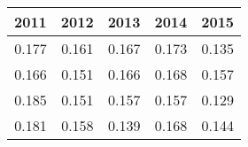 \begin{tabular}{rrrrr}
\toprule
2011 & 2012 & 2013 & 2014 & 2015 \\
\midrule
0.177 & 0.161 & 0.167 & 0.173 & 0.135 \\
0.166 & 0.151 & 0.166 & 0.168 & 0.157 \\
0.185 & 0.151 & 0.157 & 0.157 & 0.129 \\
0.181 & 0.158 & 0.139 & 0.168 & 0.144 \\
\bottomrule
\end{tabular}
